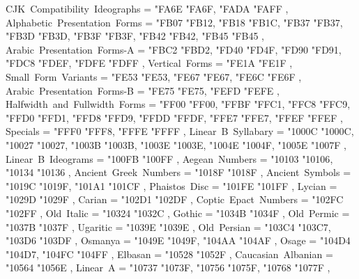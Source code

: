 {    CJK~Compatibility~Ideographs                   = { {"FA6E} {"FA6F}, {"FADA} {"FAFF} },
    Alphabetic~Presentation~Forms                  = { {"FB07} {"FB12}, {"FB18} {"FB1C}, {"FB37} {"FB37}, {"FB3D} {"FB3D}, {"FB3F} {"FB3F}, {"FB42} {"FB42}, {"FB45} {"FB45} },
    Arabic~Presentation~Forms-A                    = { {"FBC2} {"FBD2}, {"FD40} {"FD4F}, {"FD90} {"FD91}, {"FDC8} {"FDEF}, {"FDFE} {"FDFF} },
    Vertical~Forms                                 = { {"FE1A} {"FE1F} },
    Small~Form~Variants                            = { {"FE53} {"FE53}, {"FE67} {"FE67}, {"FE6C} {"FE6F} },
    Arabic~Presentation~Forms-B                    = { {"FE75} {"FE75}, {"FEFD} {"FEFE} },
    Halfwidth~and~Fullwidth~Forms                  = { {"FF00} {"FF00}, {"FFBF} {"FFC1}, {"FFC8} {"FFC9}, {"FFD0} {"FFD1}, {"FFD8} {"FFD9}, {"FFDD} {"FFDF}, {"FFE7} {"FFE7}, {"FFEF} {"FFEF} },
    Specials                                       = { {"FFF0} {"FFF8}, {"FFFE} {"FFFF} },
    Linear~B~Syllabary                             = { {"1000C} {"1000C}, {"10027} {"10027}, {"1003B} {"1003B}, {"1003E} {"1003E}, {"1004E} {"1004F}, {"1005E} {"1007F} },
    Linear~B~Ideograms                             = { {"100FB} {"100FF} },
    Aegean~Numbers                                 = { {"10103} {"10106}, {"10134} {"10136} },
    Ancient~Greek~Numbers                          = { {"1018F} {"1018F} },
    Ancient~Symbols                                = { {"1019C} {"1019F}, {"101A1} {"101CF} },
    Phaistos~Disc                                  = { {"101FE} {"101FF} },
    Lycian                                         = { {"1029D} {"1029F} },
    Carian                                         = { {"102D1} {"102DF} },
    Coptic~Epact~Numbers                           = { {"102FC} {"102FF} },
    Old~Italic                                     = { {"10324} {"1032C} },
    Gothic                                         = { {"1034B} {"1034F} },
    Old~Permic                                     = { {"1037B} {"1037F} },
    Ugaritic                                       = { {"1039E} {"1039E} },
    Old~Persian                                    = { {"103C4} {"103C7}, {"103D6} {"103DF} },
    Osmanya                                        = { {"1049E} {"1049F}, {"104AA} {"104AF} },
    Osage                                          = { {"104D4} {"104D7}, {"104FC} {"104FF} },
    Elbasan                                        = { {"10528} {"1052F} },
    Caucasian~Albanian                             = { {"10564} {"1056E} },
    Linear~A                                       = { {"10737} {"1073F}, {"10756} {"1075F}, {"10768} {"1077F} },
}
